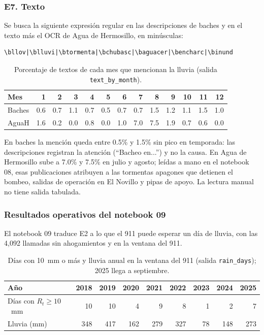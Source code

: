 \documentclass[11pt]{article}
\newcommand{\cod}[1]{\nolinkurl{#1}}
\begin{document}
\FloatBarrier
\subsubsection*{E7. Texto}

Se busca la siguiente expresión regular en las descripciones de baches y en el texto más el OCR de Agua de Hermosillo, en minúsculas:
\begin{verbatim}
\bllov|\blluvi|\btormenta|\bchubasc|\baguacer|\bencharc|\binund
\end{verbatim}

\begin{table}[!htbp]
  \centering
  \small
  \caption{Porcentaje de textos de cada mes que mencionan la lluvia (salida \cod{text_by_month}).}
  \label{tab:e7}
  \begin{tabular}{lrrrrrrrrrrrr}
    \toprule
    Mes & 1 & 2 & 3 & 4 & 5 & 6 & 7 & 8 & 9 & 10 & 11 & 12 \\
    \midrule
    Baches & 0.6 & 0.7 & 1.1 & 0.7 & 0.5 & 0.7 & 0.7 & 1.5 & 1.2 & 1.1 & 1.5 & 1.0 \\
    AguaH & 1.6 & 0.2 & 0.0 & 0.8 & 0.0 & 1.0 & 7.0 & 7.5 & 1.9 & 0.7 & 0.6 & 0.0 \\
    \bottomrule
  \end{tabular}
\end{table}

En baches la mención queda entre 0.5\% y 1.5\% sin pico en temporada: las descripciones registran la atención (``Bacheo en...'') y no la causa. En Agua de Hermosillo sube a 7.0\% y 7.5\% en julio y agosto; leídas a mano en el notebook 08, esas publicaciones atribuyen a las tormentas apagones que detienen el bombeo, salidas de operación en El Novillo y pipas de apoyo. La lectura manual no tiene salida tabulada.

\FloatBarrier
\subsubsection*{Resultados operativos del notebook 09}

El notebook 09 traduce E2 a lo que el 911 puede esperar un día de lluvia, con las 4,092 llamadas sin ahogamientos y en la ventana del 911.

\begin{table}[!htbp]
  \centering
  \small
  \caption{Días con 10~mm o más y lluvia anual en la ventana del 911 (salida \cod{rain_days}); 2025 llega a septiembre.}
  \label{tab:n9-dias}
  \begin{tabular}{lrrrrrrrr}
    \toprule
    Año & 2018 & 2019 & 2020 & 2021 & 2022 & 2023 & 2024 & 2025 \\
    \midrule
    Días con $R_t\ge 10$~mm & 10 & 10 & 4 & 9 & 8 & 1 & 2 & 7 \\
    Lluvia (mm) & 348 & 417 & 162 & 279 & 327 & 78 & 148 & 273 \\
    \bottomrule
  \end{tabular}
\end{table}
\end{document}
